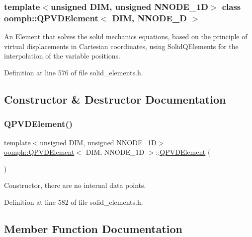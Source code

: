 \subsubsection*{template$<$unsigned D\+IM, unsigned N\+N\+O\+D\+E\+\_\+1D$>$\newline
class oomph\+::\+Q\+P\+V\+D\+Element$<$ D\+I\+M, N\+N\+O\+D\+E\+\_\+D $>$}

An Element that solves the solid mechanics equations, based on the principle of virtual displacements in Cartesian coordinates, using Solid\+Q\+Elements for the interpolation of the variable positions. 

Definition at line 576 of file solid\+\_\+elements.\+h.



\subsection{Constructor \& Destructor Documentation}
\mbox{\label{classoomph_1_1QPVDElement_a892b8c37cf64adffc8fedff55a13d1d1}} 
\subsubsection{\texorpdfstring{Q\+P\+V\+D\+Element()}{QPVDElement()}}
{\footnotesize\ttfamily template$<$unsigned D\+IM, unsigned N\+N\+O\+D\+E\+\_\+1D$>$ \\
\hyperlink{classoomph_1_1QPVDElement}{oomph\+::\+Q\+P\+V\+D\+Element}$<$ D\+IM, N\+N\+O\+D\+E\+\_\+1D $>$\+::\hyperlink{classoomph_1_1QPVDElement}{Q\+P\+V\+D\+Element} (\begin{DoxyParamCaption}{ }\end{DoxyParamCaption})\hspace{0.3cm}{\ttfamily [inline]}}



Constructor, there are no internal data points. 



Definition at line 582 of file solid\+\_\+elements.\+h.



\subsection{Member Function Documentation}
\mbox{\label{classoomph_1_1QPVDElement_a038336073cf2e0ffb368e2c95feab324}} 
